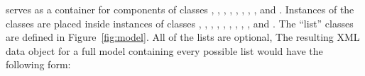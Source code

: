 \Model serves as a container for components of classes
\FunctionDefinition, \UnitDefinition, \Compartment, \Species, \Parameter,
\InitialAssignment, \Rule, \Constraint, \Reaction and \Event.
Instances of the classes are placed inside instances of classes
\ListOfFunctionDefinitions, \ListOfUnitDefinitions,
\ListOfCompartments, \ListOfSpecies, \ListOfParameters, \ListOfInitialAssignments,
\ListOfRules, \ListOfConstraints, \ListOfReactions, and
\ListOfEvents.  The ``list'' classes are defined in
Figure~\ref{fig:model}.  All of the lists are optional,   The
resulting XML data object for a full model containing every
possible list would have the following form:

\newcommand{\sayOptional}{\raisebox{0pt}[0pt][0pt]{\bigg\} \textrm{\emph{optional}}}}

